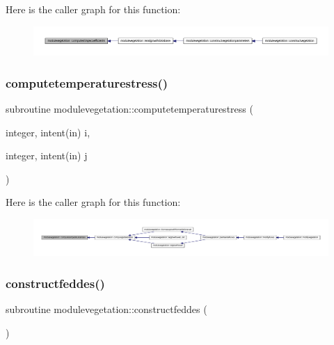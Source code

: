 Here is the caller graph for this function\+:\nopagebreak
\begin{figure}[H]
\begin{center}
\leavevmode
\includegraphics[width=350pt]{namespacemodulevegetation_a977606da8238f3bcf3eeedafa42a6582_icgraph}
\end{center}
\end{figure}
\mbox{\label{namespacemodulevegetation_a0a72b8d43553476da7abbddd263b7c85}} 
\subsubsection{\texorpdfstring{computetemperaturestress()}{computetemperaturestress()}}
{\footnotesize\ttfamily subroutine modulevegetation\+::computetemperaturestress (\begin{DoxyParamCaption}\item[{integer, intent(in)}]{i,  }\item[{integer, intent(in)}]{j }\end{DoxyParamCaption})\hspace{0.3cm}{\ttfamily [private]}}

Here is the caller graph for this function\+:\nopagebreak
\begin{figure}[H]
\begin{center}
\leavevmode
\includegraphics[width=350pt]{namespacemodulevegetation_a0a72b8d43553476da7abbddd263b7c85_icgraph}
\end{center}
\end{figure}
\mbox{\label{namespacemodulevegetation_a74fe469b99fa1d5d3f2ef2182dd59c7b}} 
\subsubsection{\texorpdfstring{constructfeddes()}{constructfeddes()}}
{\footnotesize\ttfamily subroutine modulevegetation\+::constructfeddes (\begin{DoxyParamCaption}{ }\end{DoxyParamCaption})\hspace{0.3cm}{\ttfamily [private]}}

